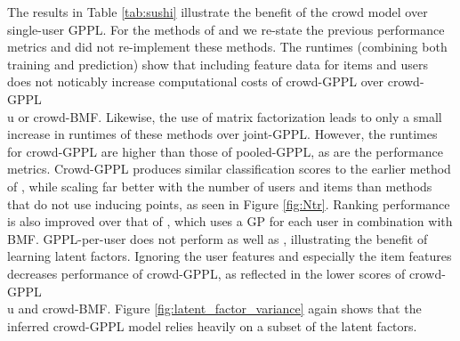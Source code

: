 The results in Table \ref{tab:sushi} illustrate the benefit of the crowd model over single-user GPPL. 
For the methods of \citep{houlsby2012collaborative} and \citep{khan2014scalable}
we re-state the previous performance metrics and did not re-implement these methods. 
The runtimes (combining both training and prediction) 
show that including feature data for items and users does not 
noticably increase computational costs of crowd-GPPL over crowd-GPPL\\u or crowd-BMF.
Likewise, the use of matrix factorization leads to only a small increase in
 runtimes of these methods over joint-GPPL. 
 However, the runtimes for crowd-GPPL are higher than those of pooled-GPPL,
 as are the performance metrics. 
Crowd-GPPL produces similar classification scores to the earlier method of 
 \citep{houlsby2012collaborative}, while scaling far better with the number of users and items
 than methods that do not use inducing points, as seen in Figure \ref{fig:Ntr}.
Ranking performance is also improved over that of \citep{khan2014scalable}, which
uses a GP for each user in combination with BMF. 
GPPL-per-user does not perform as well as \citep{khan2014scalable}, illustrating the benefit 
of learning latent factors.
Ignoring the user features and especially the item features decreases performance of crowd-GPPL, 
as reflected in the lower scores of crowd-GPPL\\u and crowd-BMF.
Figure \ref{fig:latent_factor_variance} again shows that the inferred crowd-GPPL model relies
heavily on a subset of the latent factors.
